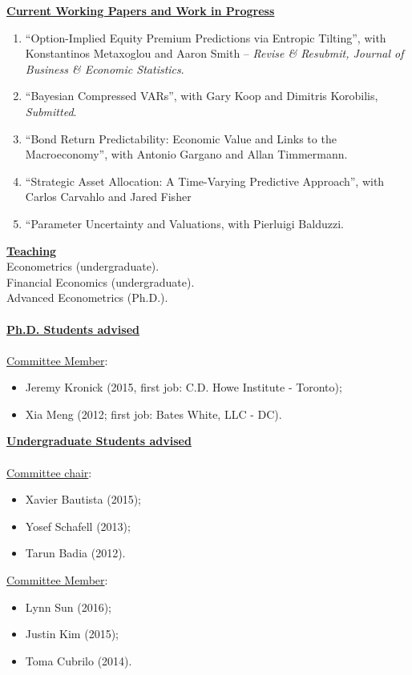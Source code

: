\documentclass[12pt]{article}
\begin{document}
\underline{\textbf{Current Working Papers and Work in Progress}}
\begin{enumerate}
	\setcounter{enumi}{\theenumTemp}
	\item ``Option-Implied Equity Premium Predictions via Entropic Tilting'', with Konstantinos Metaxoglou  and Aaron Smith -- \textit{Revise \& Resubmit, Journal of Business \& Economic Statistics}.
	\item ``Bayesian Compressed VARs'', with Gary Koop and Dimitris Korobilis, \textit{Submitted}.
	\item ``Bond Return Predictability: Economic Value and Links to the Macroeconomy'', with Antonio Gargano and Allan Timmermann.
	\item ``Strategic Asset Allocation: A Time-Varying Predictive Approach'', with Carlos Carvahlo and Jared Fisher 
	\item ``Parameter Uncertainty and Valuations, with Pierluigi Balduzzi.
	
\end{enumerate}

\underline{\textbf{Teaching}}\\
Econometrics (undergraduate).\\
Financial Economics (undergraduate). \\
Advanced Econometrics (Ph.D.). \\ \\
\underline{\textbf{Ph.D. Students advised}} \\ \\
\underline{Committee Member}: 
\begin{itemize}
	\item Jeremy Kronick (2015, first job: C.D. Howe Institute - Toronto);
	\item Xia Meng (2012; first job: Bates White, LLC - DC). 
\end{itemize}
\underline{\textbf{Undergraduate Students advised}} \\ \\
\underline{Committee chair}: 
\begin{itemize}
	\item Xavier Bautista (2015);
	\item Yosef Schafell (2013);
	\item Tarun Badia (2012). 
\end{itemize}
\underline{Committee Member}: 
\begin{itemize}
	\item Lynn Sun (2016);
	\item Justin Kim (2015);
	\item Toma Cubrilo (2014).
\end{itemize}
\end{document}
